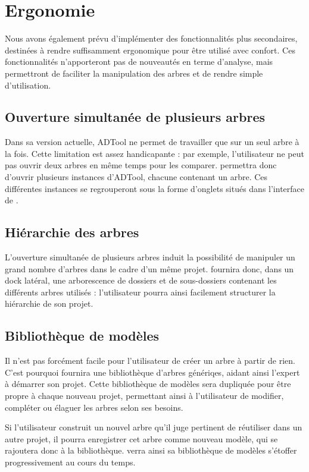 \section{Ergonomie}
	Nous avons également prévu d'implémenter des fonctionnalités plus secondaires, destinées à rendre \glasir{} suffisamment ergonomique pour être utilisé avec confort. Ces fonctionnalités n'apporteront pas de nouveautés en terme d'analyse, mais permettront de faciliter la manipulation des arbres et de rendre \glasir{} simple d'utilisation.	

	\subsection{Ouverture simultanée de plusieurs arbres}
		Dans sa version actuelle, ADTool ne permet de travailler que sur un seul arbre à la fois. Cette limitation est assez handicapante : par exemple, l'utilisateur ne peut pas ouvrir deux arbres en même temps pour les comparer. \glasir{} permettra donc d'ouvrir plusieurs instances d'ADTool, chacune contenant un arbre. Ces différentes instances se regrouperont sous la forme d'onglets situés dans l'interface de \glasir{}.
	
	\subsection{Hiérarchie des arbres}
		L'ouverture simultanée de plusieurs arbres induit la possibilité de manipuler un grand nombre d'arbres dans le cadre d'un même projet. \glasir{} fournira donc, dans un dock latéral, une arborescence de dossiers et de sous-dossiers contenant les différents arbres utilisés : l'utilisateur pourra ainsi facilement structurer la hiérarchie de son projet.
	
	\subsection{Bibliothèque de modèles}
		Il n'est pas forcément facile pour l'utilisateur de créer un arbre à partir de rien. C'est pourquoi \glasir{} fournira une bibliothèque d'arbres génériqes, aidant ainsi l'expert à démarrer son projet. Cette bibliothèque de modèles sera dupliquée pour être propre à chaque nouveau projet, permettant ainsi à l'utilisateur de modifier, compléter ou élaguer les arbres selon ses besoins.
		
		Si l'utilisateur construit un nouvel arbre qu'il juge pertinent de réutiliser dans un autre projet, il pourra enregistrer cet arbre comme nouveau modèle, qui se rajoutera donc à la bibliothèque. \glasir{} verra ainsi sa bibliothèque de modèles s'étoffer progressivement au cours du temps.

